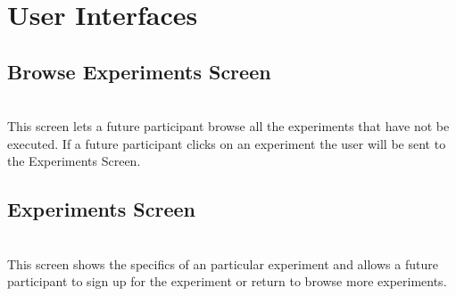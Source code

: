 \section{User Interfaces}
\subsection{Browse Experiments Screen}
\setlength\fboxsep{0pt}
\setlength\fboxrule{0.5pt}
\\
This screen lets a future participant browse all the experiments that have not be executed.  If a future participant clicks on an experiment the user will be sent to the Experiments Screen.

\subsection{Experiments Screen}
\setlength\fboxsep{0pt}
\setlength\fboxrule{0.5pt}
\\
This screen shows the specifics of an particular experiment and allows a future participant to sign up for the experiment or return to browse more experiments.

